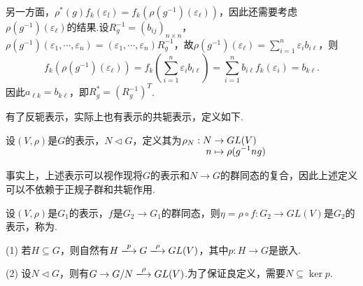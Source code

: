 另一方面，$\rho^*(g)f_k(\varepsilon_l)=f_k\left(\rho(g^{-1})(\varepsilon_\ell)\right)$，因此还需要考虑$\rho(g^{-1})(\varepsilon_\ell)$的结果.设$R_g^{-1}=(b_{ij})_{n\times n}$，
$\rho(g^{-1})(\varepsilon_1,\cdots,\varepsilon_n)=(\varepsilon_1,\cdots,\varepsilon_n)R_{g}^{-1}$，故$\rho(g^{-1})(\varepsilon_\ell)=\sum_{i=1}^n\varepsilon_i b_{i\ell}$，则
\begin{equation*}
    f_k\left(\rho(g^{-1})(\varepsilon_\ell)\right)=f_k\left(\sum_{i=1}^n\varepsilon_i b_{i\ell}\right)=\sum_{i=1}^n b_{i\ell}f_k(\varepsilon_i)=b_{k\ell}.
\end{equation*}
因此$a_{\ell k}=b_{k\ell}$，即$R^*_g=\left(R_{g}^{-1}\right)^T$.\par
有了反轭表示，实际上也有表示的共轭表示，定义如下.
\begin{definition}
    设$(V,\rho)$是$G$的表示，$N\vartriangleleft G$，定义其为$\setjot[-2]\begin{aligned}[t]
        \rho_N:N&\to GL(V) \\
        n &\mapsto \rho(g^{-1}ng)
    \end{aligned}$
\end{definition}
事实上，上述表示可以视作现将$G$的表示和$N\to G$的群同态的复合，因此上述定义可以不依赖于正规子群和共轭作用.\par
\begin{definition}
    设$(V,\rho)$是$G_1$的表示，$f$是$G_2\to G_1$的群同态，则$\eta=\rho\circ f:G_2\to GL(V)$是$G_2$的表示，称为.
\end{definition}
\begin{instance}
    (1) 若$H\subseteq G$，则自然有$H\xlongrightarrow{p}G\xlongrightarrow{\rho}GL(V)$，其中$p:H\to G$是嵌入.\par
    (2) 设$N\vartriangleleft G$，则有$G\to G/N \xlongrightarrow{\rho} GL(V)$.为了保证良定义，需要$N\subseteq \ker p$.
\end{instance}

